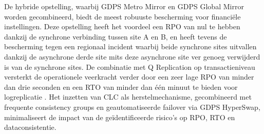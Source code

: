 De hybride opstelling, waarbij GDPS Metro Mirror en GDPS Global Mirror worden gecombineerd, biedt de meest robuuste bescherming voor financiële instellingen.
Deze opstelling heeft het voordeel een RPO van nul te hebben dankzij de synchrone verbinding tussen site A en B, en heeft tevens de bescherming tegen een regionaal incident waarbij beide synchrone sites uitvallen dankzij de asynchrone derde site mits deze asynchrone site ver genoeg verwijderd is van de synchrone sites.
De combinatie met Q Replication op transactieniveau versterkt de operationele veerkracht verder door een zeer lage RPO van minder dan drie seconden en een RTO van minder dan één minuut te bieden voor logreplicatie \autocite{bourbonnais2015}.
Het inzetten van CLC als herstelmechanisme, gecombineerd met frequente consistency groups en geautomatiseerde failover via GDPS HyperSwap, minimaliseert de impact van de geïdentificeerde risico's op RPO, RTO en dataconsistentie.